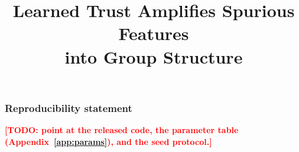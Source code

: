 \documentclass{article}
\title{Learned Trust Amplifies Spurious Features\\into Group Structure}
\author{%
  \todo{author block}
}
\newcommand{\todo}[1]{\textcolor{red}{\textbf{[TODO: #1]}}}
\begin{document}
\maketitle

\begin{abstract}

\end{abstract}












\subsubsection*{Reproducibility statement}
\todo{point at the released code, the parameter table (Appendix~\ref{app:params}),
and the seed protocol.}




\appendix




\end{document}
